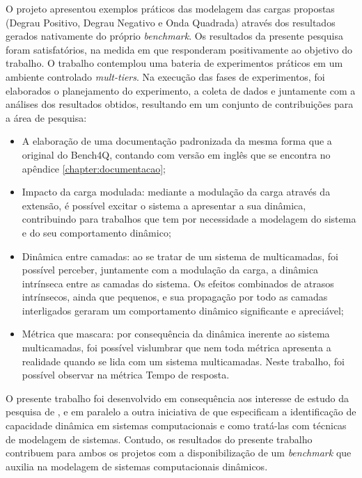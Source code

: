 O projeto apresentou exemplos práticos das modelagem das cargas propostas (Degrau Positivo, Degrau Negativo e Onda Quadrada) através dos resultados gerados nativamente do próprio \textit{benchmark}. Os resultados da presente pesquisa foram satisfatórios, na medida em que responderam positivamente ao objetivo do trabalho. O trabalho contemplou uma bateria de experimentos práticos em um ambiente controlado \textit{mult-tiers}. Na execução das fases de experimentos, foi elaborados o planejamento do experimento, a coleta de dados e juntamente com a análises dos resultados obtidos, resultando em um conjunto de contribuições para a área de pesquisa:
\begin{itemize}
	\item A elaboração de uma documentação padronizada da mesma forma que a original do Bench4Q, contando com versão em inglês que se encontra no apêndice \ref{chapter:documentacao};
	
	\item Impacto da carga modulada: mediante a modulação da carga através da extensão, é possível excitar o sistema a apresentar a sua dinâmica, contribuindo para trabalhos que tem por necessidade a modelagem do sistema e do seu comportamento dinâmico;
	
	\item Dinâmica entre camadas: ao se tratar de um sistema de multicamadas, foi possível perceber, juntamente com a modulação da carga, a dinâmica intrínseca entre as camadas do sistema. Os efeitos combinados de atrasos intrínsecos, ainda que pequenos, e sua propagação por todo as camadas interligados geraram um comportamento dinâmico significante e apreciável;
	
	\item Métrica que mascara: por consequência da dinâmica inerente ao sistema multicamadas, foi possível vislumbrar que nem toda métrica apresenta a realidade quando se lida com um sistema multicamadas. Neste trabalho, foi possível observar na métrica Tempo de resposta.
\end{itemize} 

O presente trabalho foi desenvolvido em consequência aos interesse de estudo da pesquisa de , e em paralelo a outra iniciativa de  que especificam a identificação de capacidade dinâmica em sistemas computacionais e como tratá-las com técnicas de modelagem de sistemas. Contudo, os resultados do presente trabalho contribuem para ambos os projetos com a disponibilização de um \textit{benchmark} que auxilia na modelagem de sistemas computacionais dinâmicos.


